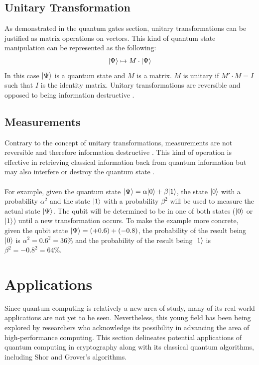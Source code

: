 \documentclass[12pt]{third-rep}
\begin{document}
\newpage
\section{Unitary Transformation}
As demonstrated in the quantum gates section, unitary transformations can be justified as matrix operations on vectors. This kind of quantum state manipulation can be represented as the following:
$${\left\vert{\Psi}\right\rangle}\mapsto M\cdot{\left\vert{\Psi}\right\rangle}$$
In this case ${\left\vert{\Psi}\right\rangle}$ is a quantum state and $M$ is a matrix. $M$ is unitary if $M'\cdot M=I$ such that $I$ is the identity matrix. Unitary transformations are reversible and opposed to being information destructive \cite{non-qc}.

\section{Measurements}
Contrary to the concept of unitary transformations, measurements are not reversible and therefore information destructive \cite{non-qc}. This kind of operation is effective in retrieving classical information back from quantum information but may also interfere or destroy the quantum state \cite{measure}. \\\\
For example, given the quantum state ${\left\vert{\Psi}\right\rangle}=\alpha{\left\vert{0}\right\rangle}+\beta{\left\vert{1}\right\rangle}$, the state ${\left\vert{0}\right\rangle}$ with a probability $\alpha^2$ and the state ${\left\vert{1}\right\rangle}$ with a probability $\beta^2$ will be used to measure the actual state ${\left\vert{\Psi}\right\rangle}$. The qubit will be determined to be in one of both states (${\left\vert{0}\right\rangle}$ or ${\left\vert{1}\right\rangle}$) until a new transformation occurs. To make the example more concrete, given the qubit state ${\left\vert{\Psi}\right\rangle}=(+0.6)+(-0.8)$, the probability of the result being ${\left\vert{0}\right\rangle}$ is $\alpha^2=0.6^2=36\%$ and the probability of the result being ${\left\vert{1}\right\rangle}$ is $\beta^2=-0.8^2=64\%$.


\chapter{Applications}

Since quantum computing is relatively a new area of study, many of its real-world applications are not yet to be seen. Nevertheless, this young field has been being explored by researchers who acknowledge its possibility in advancing the area of high-performance computing. This section delineates potential applications of quantum computing in cryptography along with its classical quantum algorithms, including Shor and Grover's algorithms.
\end{document}
